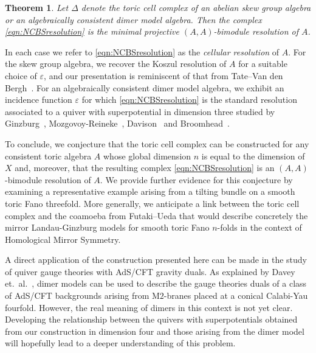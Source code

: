 \documentclass[11pt,a4paper]{amsart}
\numberwithin{equation}{section}
\newtheorem{theorem}{Theorem}[section]
\theoremstyle{definition}
\theoremstyle{remark}
\begin{document}
\begin{theorem}
\label{thm:1.2}
Let $\Delta$ denote the toric cell complex of an abelian skew group algebra or an algebraically consistent dimer model algebra. 
Then the complex \eqref{eqn:NCBSresolution} is the minimal projective $(A,A)$-bimodule resolution of $A$.
\end{theorem}

In each case we refer to \eqref{eqn:NCBSresolution} as the \emph{cellular resolution} of $A$. For the skew group algebra, we recover the Koszul resolution of $A$ for a suitable choice of $\varepsilon$, and our presentation is reminiscent of that from Tate--Van den Bergh~\cite[\S3]{TateVandenbergh}. For an algebraically consistent dimer model algebra, we exhibit an incidence function $\varepsilon$ for which \eqref{eqn:NCBSresolution} is the standard resolution associated to a quiver with superpotential in dimension three studied by Ginzburg~\cite{Ginzburg}, Mozgovoy-Reineke~\cite{MozgovoyReineke}, Davison~\cite{Davison} and Broomhead~\cite{Broomhead}.

To conclude, we conjecture that the toric cell complex can be constructed for any consistent toric algebra $A$ whose global dimension $n$ is equal to the dimension of $X$ and, moreover, that the resulting complex \eqref{eqn:NCBSresolution} is an  $(A,A)$-bimodule resolution of $A$. We provide further evidence for this conjecture by examining a representative example arising from a tilting bundle on a smooth toric Fano threefold. More generally, we anticipate a link between the toric cell complex and the coamoeba from Futaki--Ueda \cite{FutakiUeda} that would describe concretely the mirror Landau-Ginzburg models for smooth toric Fano $n$-folds in the context of Homological Mirror Symmetry. 

A direct application of the construction presented here can be made in the study of quiver gauge theories with AdS/CFT gravity duals. As explained by Davey et.\ al.~\cite{DHMT1}, dimer models can be used to describe the gauge theories duals of a class of AdS/CFT backgrounds arising from M$2$-branes placed at a conical Calabi-Yau fourfold. However, the real meaning of dimers in this context is not yet clear. Developing the relationship between the quivers with superpotentials obtained from our construction in dimension four and those arising from the dimer model will hopefully lead to a deeper understanding of this problem.

\medskip
\end{document}
